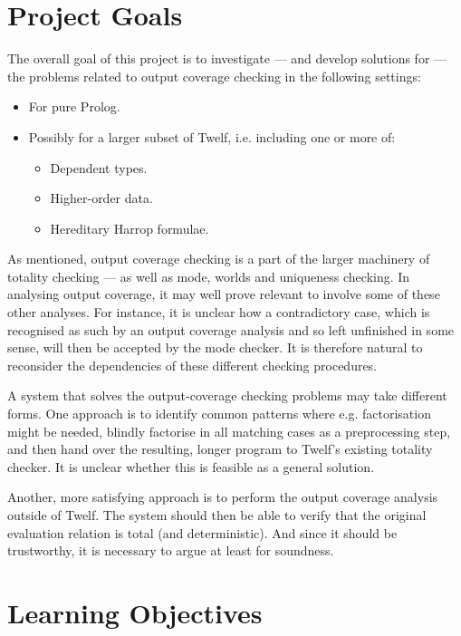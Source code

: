 \documentclass[12pt]{article}
\begin{document}

\section*{Project Goals}

The overall goal of this project is to investigate --- and develop solutions for --- the problems related to output coverage checking in the following settings:

\begin{itemize}
	\item For pure Prolog.
  \item Possibly for a larger subset of Twelf, i.e. including one or more of:
    \begin{itemize}
      \item Dependent types.
      \item Higher-order data.
      \item Hereditary Harrop formulae.
    \end{itemize}
\end{itemize}

As mentioned, output coverage checking is a part of the larger machinery of totality checking --- as well as mode, worlds and uniqueness checking.
In analysing output coverage, it may well prove relevant to involve some of these other analyses.
For instance, it is unclear how a contradictory case, which is recognised as such by an output coverage analysis and so left unfinished in some sense, will then be accepted by the mode checker.
It is therefore natural to reconsider the dependencies of these different checking procedures.

A system that solves the output-coverage checking problems may take different forms.
One approach is to identify common patterns where e.g. factorisation might be needed, blindly factorise in all matching cases as a preprocessing step, and then hand over the resulting, longer program to Twelf's existing totality checker.
It is unclear whether this is feasible as a general solution.

Another, more satisfying approach is to perform the output coverage analysis outside of Twelf.
The system should then be able to verify that the original evaluation relation is total (and deterministic).
And since it should be trustworthy, it is necessary to argue at least for soundness.

\section*{Learning Objectives}
\end{document}
